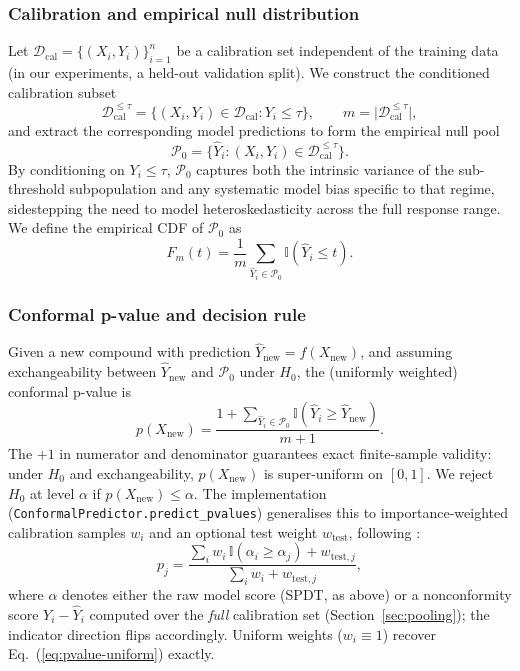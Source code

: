 \documentclass[11pt]{article}
\newcommand{\Pcal}{\mathcal{P}}
\newcommand{\Dcal}{\mathcal{D}}
\begin{document}
\subsubsection{Calibration and empirical null distribution}

Let $\Dcal_{\mathrm{cal}} = \{(X_i, Y_i)\}_{i=1}^n$ be a calibration set
independent of the training data (in our experiments, a held-out validation
split). We construct the conditioned calibration subset
\[
\Dcal_{\mathrm{cal}}^{\le \tau} = \{(X_i, Y_i) \in \Dcal_{\mathrm{cal}} : Y_i \le \tau\},
\qquad m = \bigl|\Dcal_{\mathrm{cal}}^{\le \tau}\bigr|,
\]
and extract the corresponding model predictions to form the empirical null
pool
\[
\Pcal_0 = \{\hat Y_i : (X_i, Y_i) \in \Dcal_{\mathrm{cal}}^{\le \tau}\}.
\]
By conditioning on $Y_i \le \tau$, $\Pcal_0$ captures both the intrinsic
variance of the sub-threshold subpopulation and any systematic model bias
specific to that regime, sidestepping the need to model heteroskedasticity
across the full response range. We define the empirical CDF of $\Pcal_0$ as
\[
F_m(t) = \frac{1}{m}\sum_{\hat Y_i \in \Pcal_0} \mathbb{I}(\hat Y_i \le t).
\]

\subsubsection{Conformal p-value and decision rule}
\label{sec:pvalue}

Given a new compound with prediction $\hat Y_{\mathrm{new}} = f(X_{\mathrm{new}})$,
and assuming exchangeability between $\hat Y_{\mathrm{new}}$ and $\Pcal_0$
under $H_0$, the (uniformly weighted) conformal p-value is
\begin{equation}
p(X_{\mathrm{new}}) = \frac{1 + \sum_{\hat Y_i \in \Pcal_0} \mathbb{I}(\hat Y_i \ge \hat Y_{\mathrm{new}})}{m+1}.
\label{eq:pvalue-uniform}
\end{equation}
The $+1$ in numerator and denominator guarantees exact finite-sample validity:
under $H_0$ and exchangeability, $p(X_{\mathrm{new}})$ is super-uniform on
$[0,1]$. We reject $H_0$ at level $\alpha$ if $p(X_{\mathrm{new}}) \le \alpha$.
The implementation (\texttt{ConformalPredictor.predict\_pvalues}) generalises
this to importance-weighted calibration samples $w_i$ and an optional test
weight $w_{\mathrm{test}}$, following \citet{tibshirani2019}:
\[
p_j = \frac{\sum_i w_i\, \mathbb{I}(\alpha_i \ge \alpha_j) + w_{\mathrm{test},j}}
           {\sum_i w_i + w_{\mathrm{test},j}},
\label{eq:weighted-pvalue}
\]
where $\alpha$ denotes either the raw model score (SPDT, as above) or a
nonconformity score $Y_i - \hat Y_i$ computed over the \emph{full} calibration
set (Section~\ref{sec:pooling}); the indicator direction flips accordingly.
Uniform weights ($w_i \equiv 1$) recover Eq.~(\ref{eq:pvalue-uniform}) exactly.
\end{document}
